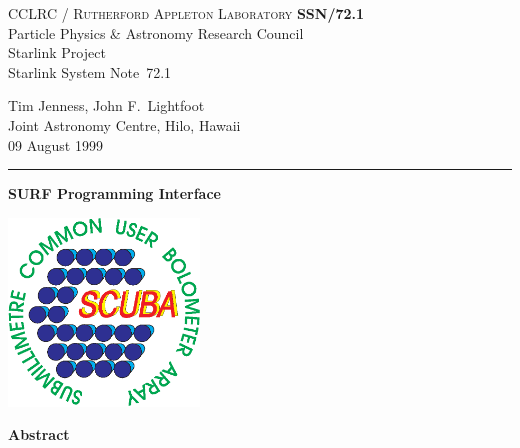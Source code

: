 \documentclass[twoside,11pt]{article}
\newcommand{\stardoccategory}  {Starlink System Note}
\newcommand{\stardocinitials}  {SSN}
\newcommand{\stardocnumber}    {72.1}
\newcommand{\stardocauthors}   {Tim Jenness, John F.\ Lightfoot\\
                                Joint Astronomy Centre, Hilo, Hawaii}
\newcommand{\stardocdate}      {09 August 1999}
\newcommand{\stardoctitle}     {SURF Programming Interface}
\newcommand{\stardocname}{\stardocinitials /\stardocnumber}
\newenvironment{latexonly}{}{}
\renewcommand{\_}{\texttt{\symbol{95}}}
\begin{document}
\thispagestyle{empty}

\begin{latexonly}
   CCLRC / \textsc{Rutherford Appleton Laboratory} \hfill \textbf{\stardocname}\\
   {\large Particle Physics \& Astronomy Research Council}\\
   {\large Starlink Project\\}
   {\large \stardoccategory\ \stardocnumber}
   \begin{flushright}
   \stardocauthors\\
   \stardocdate
   \end{flushright}
   \vspace{-4mm}
   \rule{\textwidth}{0.5mm}
   \vspace{5mm}
   \begin{center}
   {\Large\textbf{\stardoctitle}}
   \end{center}
   \vspace{5mm}

\begin{center}
\includegraphics[width=2.0in]{ssn72_logo.eps}
\end{center}

   \vspace{10mm}
   \begin{center}
      {\Large\textbf{Abstract}}
   \end{center}
\end{latexonly}
\end{document}
